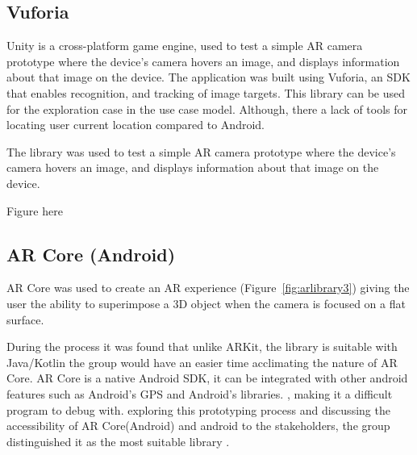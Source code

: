 \subsection{Vuforia}
Unity is a cross-platform game engine, used to test a simple AR camera prototype where the device’s camera hovers an image, and displays information about that image on the device. The application was built using Vuforia, an SDK that enables recognition, and tracking of image targets. This library can be used for the exploration case in the use case model. Although, there  a lack of tools for locating user current location compared to Android.

The  library was used to test a simple AR camera prototype where the device’s camera hovers an image, and displays information about that image on the device.

Figure here

\subsection{AR Core (Android)}
AR Core was used to create an AR experience (Figure~\ref{fig:arlibrary3}) giving the user the ability to superimpose a 3D object when the camera is focused on a flat surface.

During the process it was found that  unlike ARKit, the library is suitable with Java/Kotlin  the group would have an easier time acclimating  the nature of AR Core.  AR Core is a native Android SDK, it can be integrated with other  android features such as Android's GPS and Android's  libraries.  , making it a difficult program to debug with.  exploring this prototyping process and discussing the accessibility of AR Core(Android) and android to the stakeholders, the group distinguished it as the most suitable library . 


